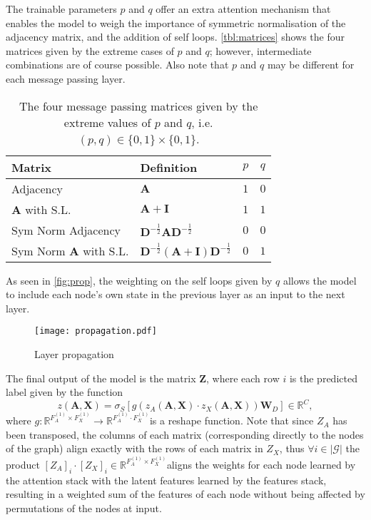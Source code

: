 \documentclass{article}
\renewcommand{\vec}[1]{\mathbf{#1}}
\theoremstyle{definition}
\newcommand{\Real}[1]{\mathbb{R}^{#1}}
\begin{document}
The trainable parameters $p$ and $q$ offer an extra attention mechanism that enables the model to weigh the importance of symmetric normalisation of the adjacency matrix, and the addition of self loops. \autoref{tbl:matrices} shows the four matrices given by the extreme cases of $p$ and $q$; however, intermediate combinations are of course possible. Also note that $p$ and $q$ may be different for each message passing layer.

\begin{table}[h!]
  \small
  \begin{tabularx}{\linewidth}{lXcc}
    \toprule
    Matrix & Definition & $p$ & $q$ \\
    \midrule
    Adjacency & $\vec{A}$ & $1$ & $0$ \\
    $\vec{A}$ with S.L. & $\vec{A} + \vec{I}$ & $1$ & $1$ \\
    Sym Norm Adjacency & $\vec{D}^{-\frac{1}{2}} \vec{A} \vec{D}^{-\frac{1}{2}}$ & $0$ & $0$ \\
    Sym Norm $\vec{A}$ with S.L. & $\vec{D}^{-\frac{1}{2}} (\vec{A} + \vec{I}) \vec{D}^{-\frac{1}{2}}$ & $0$ & $1$ \\
    \bottomrule
  \end{tabularx}
  \caption{The four message passing matrices given by the extreme values of $p$ and $q$, i.e. $(p, q) \in \{0, 1\} \times \{0, 1\}$.}
  \label{tbl:matrices}
\end{table}

As seen in \autoref{fig:prop}, the weighting on the self loops given by $q$ allows the model to include each node's own state in the previous layer as an input to the next layer.

\begin{figure}[htb]
  \centering
  \texttt{[image: propagation.pdf]}
  \caption{Layer propagation}
  \label{fig:prop}
\end{figure}

The final output of the model is the matrix $\vec{Z}$, where each row $i$ is the predicted label given by the function
\small
\begin{equation}
  \label{eq:z}
  z(\vec{A}, \vec{X}) = \sigma_S \left[ g\left( z_A\left(\vec{A}, \vec{X}\right) \cdot z_X\left(\vec{A}, \vec{X}\right) \right) \vec{W}_D \right] \in \Real{C},
\end{equation}
\normalsize
where \small$g : \Real{F_A^{(1)} \times F_X^{(1)}} \rightarrow \Real{F_A^{(1)} \cdot F_X^{(1)}}$\normalsize is a reshape function. Note that since $Z_A$ has been transposed, the columns of each matrix (corresponding directly to the nodes of the graph) align exactly with the rows of each matrix in $Z_X$, thus $\forall i \in |\mathcal{G}|$ the product \small$\left[Z_A\right]_i \cdot \left[Z_X\right]_i \in \Real{F_A^{(1)} \times F_X^{(1)}}$\normalsize aligns the weights for each node learned by the attention stack with the latent features learned by the features stack, resulting in a weighted sum of the features of each node without being affected by permutations of the nodes at input.
\end{document}
